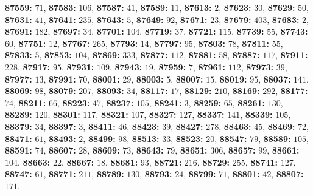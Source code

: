 \textsf{\bfseries 87559:} $71$, \textsf{\bfseries 87583:} $106$, \textsf{\bfseries 87587:} $41$, \textsf{\bfseries 87589:} $11$, \textsf{\bfseries 87613:} $2$, \textsf{\bfseries 87623:} $30$, \textsf{\bfseries 87629:} $50$, \textsf{\bfseries 87631:} $41$, \textsf{\bfseries 87641:} $235$, \textsf{\bfseries 87643:} $5$, \textsf{\bfseries 87649:} $92$, \textsf{\bfseries 87671:} $23$, \textsf{\bfseries 87679:} $403$, \textsf{\bfseries 87683:} $2$, \textsf{\bfseries 87691:} $182$, \textsf{\bfseries 87697:} $34$, \textsf{\bfseries 87701:} $104$, \textsf{\bfseries 87719:} $37$, \textsf{\bfseries 87721:} $115$, \textsf{\bfseries 87739:} $55$, \textsf{\bfseries 87743:} $60$, \textsf{\bfseries 87751:} $12$, \textsf{\bfseries 87767:} $265$, \textsf{\bfseries 87793:} $14$, \textsf{\bfseries 87797:} $95$, \textsf{\bfseries 87803:} $78$, \textsf{\bfseries 87811:} $55$, \textsf{\bfseries 87833:} $5$, \textsf{\bfseries 87853:} $104$, \textsf{\bfseries 87869:} $333$, \textsf{\bfseries 87877:} $112$, \textsf{\bfseries 87881:} $58$, \textsf{\bfseries 87887:} $117$, \textsf{\bfseries 87911:} $228$, \textsf{\bfseries 87917:} $95$, \textsf{\bfseries 87931:} $109$, \textsf{\bfseries 87943:} $19$, \textsf{\bfseries 87959:} $7$, \textsf{\bfseries 87961:} $112$, \textsf{\bfseries 87973:} $39$, \textsf{\bfseries 87977:} $13$, \textsf{\bfseries 87991:} $70$, \textsf{\bfseries 88001:} $29$, \textsf{\bfseries 88003:} $5$, \textsf{\bfseries 88007:} $15$, \textsf{\bfseries 88019:} $95$, \textsf{\bfseries 88037:} $141$, \textsf{\bfseries 88069:} $98$, \textsf{\bfseries 88079:} $207$, \textsf{\bfseries 88093:} $34$, \textsf{\bfseries 88117:} $17$, \textsf{\bfseries 88129:} $210$, \textsf{\bfseries 88169:} $292$, \textsf{\bfseries 88177:} $74$, \textsf{\bfseries 88211:} $66$, \textsf{\bfseries 88223:} $47$, \textsf{\bfseries 88237:} $105$, \textsf{\bfseries 88241:} $3$, \textsf{\bfseries 88259:} $65$, \textsf{\bfseries 88261:} $130$, \textsf{\bfseries 88289:} $120$, \textsf{\bfseries 88301:} $117$, \textsf{\bfseries 88321:} $107$, \textsf{\bfseries 88327:} $127$, \textsf{\bfseries 88337:} $141$, \textsf{\bfseries 88339:} $105$, \textsf{\bfseries 88379:} $34$, \textsf{\bfseries 88397:} $3$, \textsf{\bfseries 88411:} $46$, \textsf{\bfseries 88423:} $39$, \textsf{\bfseries 88427:} $278$, \textsf{\bfseries 88463:} $45$, \textsf{\bfseries 88469:} $72$, \textsf{\bfseries 88471:} $61$, \textsf{\bfseries 88493:} $2$, \textsf{\bfseries 88499:} $98$, \textsf{\bfseries 88513:} $33$, \textsf{\bfseries 88523:} $20$, \textsf{\bfseries 88547:} $79$, \textsf{\bfseries 88589:} $105$, \textsf{\bfseries 88591:} $74$, \textsf{\bfseries 88607:} $28$, \textsf{\bfseries 88609:} $73$, \textsf{\bfseries 88643:} $79$, \textsf{\bfseries 88651:} $306$, \textsf{\bfseries 88657:} $99$, \textsf{\bfseries 88661:} $104$, \textsf{\bfseries 88663:} $22$, \textsf{\bfseries 88667:} $18$, \textsf{\bfseries 88681:} $93$, \textsf{\bfseries 88721:} $216$, \textsf{\bfseries 88729:} $255$, \textsf{\bfseries 88741:} $127$, \textsf{\bfseries 88747:} $61$, \textsf{\bfseries 88771:} $211$, \textsf{\bfseries 88789:} $130$, \textsf{\bfseries 88793:} $24$, \textsf{\bfseries 88799:} $71$, \textsf{\bfseries 88801:} $42$, \textsf{\bfseries 88807:} $171$, 
